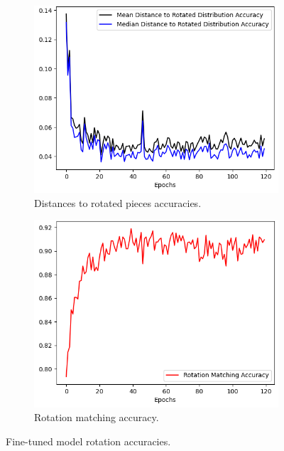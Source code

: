 \begin{figure}[]
    \begin{subfigure}[h]{0.5\linewidth}
        \includegraphics[width=\columnwidth]{images/rotation_metrics_evolution_openshape.png}
        \caption{Distances to rotated pieces accuracies.}
    \end{subfigure}
    \hfill
    \begin{subfigure}[h]{0.5\linewidth}
        \includegraphics[width=\columnwidth]{images/rotation_accuracy_evolution_openshape.png}
        \caption{Rotation matching accuracy.}
    \end{subfigure}
    \caption{Fine-tuned model rotation accuracies.}
\end{figure}

